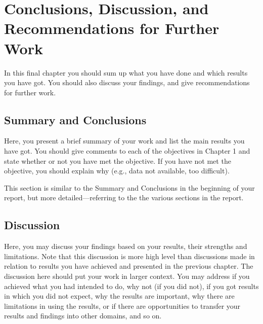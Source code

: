 \chapter[Conclusions]{Conclusions, Discussion, and Recommendations for Further Work}
\label{chp:conclusions}
\begin{info}
	In this final chapter you should sum up what you have done and which results you have got. You should also discuss your findings, and give recommendations for further work.
\end{info}



\section{Summary and Conclusions}
\label{sec:summary}
\begin{info}
	Here, you present a brief summary of your work and list the main results you have got. You should give comments to each of the objectives in Chapter 1 and state whether or not you have met the objective. If you have not met the objective, you should explain why (e.g., data not available, too difficult).

	This section is similar to the Summary and Conclusions in the beginning of your report, but more detailed---referring to the the various sections in the report.
\end{info}



\section{Discussion}
\label{sec:discussion}
\begin{info}
	Here, you may discuss your findings based on your results, their strengths and limitations. Note that this discussion is more high level than discussions made in relation to results you have achieved and presented in the previous chapter. The discussion here should put your work in larger context. You may address if you achieved what you had intended to do, why not (if you did not), if you got results in which you did not expect, why the results are important, why there are limitations in using the results, or if there are opportunities to transfer your results and findings into other domains, and so on.
\end{info}




